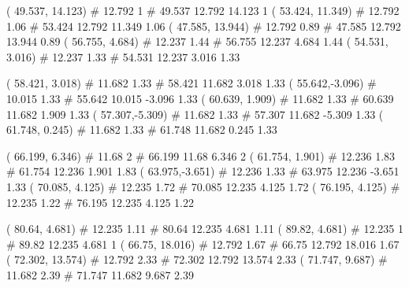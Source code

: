 \documentclass[a4paper,openbib,10pt]{article}
\newenvironment{treegraph}{\begin{graph}}{\end{graph}}
\begin{document}
\begin{treegraph}
  ( 49.537, 14.123) #     12.792    1
   #    49.537    12.792    14.123    1
  ( 53.424, 11.349) #     12.792    1.06
   #    53.424    12.792    11.349    1.06
  ( 47.585, 13.944) #     12.792    0.89
   #    47.585    12.792    13.944    0.89
  ( 56.755, 4.684) #     12.237    1.44
   #    56.755    12.237    4.684    1.44
  ( 54.531, 3.016) #     12.237    1.33
   #    54.531    12.237    3.016    1.33

  ( 58.421, 3.018) #     11.682    1.33
   #    58.421    11.682    3.018    1.33
  ( 55.642,-3.096) #     10.015    1.33
   #    55.642    10.015    -3.096    1.33
  ( 60.639, 1.909) #     11.682    1.33
   #    60.639    11.682    1.909    1.33
  ( 57.307,-5.309) #     11.682    1.33
   #    57.307    11.682    -5.309    1.33
  ( 61.748, 0.245) #     11.682    1.33
   #    61.748    11.682    0.245    1.33

  ( 66.199, 6.346) #     11.68    2
   #    66.199    11.68    6.346    2
  ( 61.754, 1.901) #     12.236    1.83
   #    61.754    12.236    1.901    1.83
  ( 63.975,-3.651) #     12.236    1.33
   #    63.975    12.236    -3.651    1.33
  ( 70.085, 4.125) #     12.235    1.72
   #    70.085    12.235    4.125    1.72
  ( 76.195, 4.125) #     12.235    1.22
   #    76.195    12.235    4.125    1.22

  ( 80.64, 4.681) #     12.235    1.11
   #    80.64    12.235    4.681    1.11
  ( 89.82, 4.681) #     12.235    1
   #    89.82    12.235    4.681    1
  ( 66.75, 18.016) #     12.792    1.67
   #    66.75    12.792    18.016    1.67
  ( 72.302, 13.574) #     12.792    2.33
   #    72.302    12.792    13.574    2.33
  ( 71.747, 9.687) #     11.682    2.39
   #    71.747    11.682    9.687    2.39


\end{treegraph}
\end{document}
